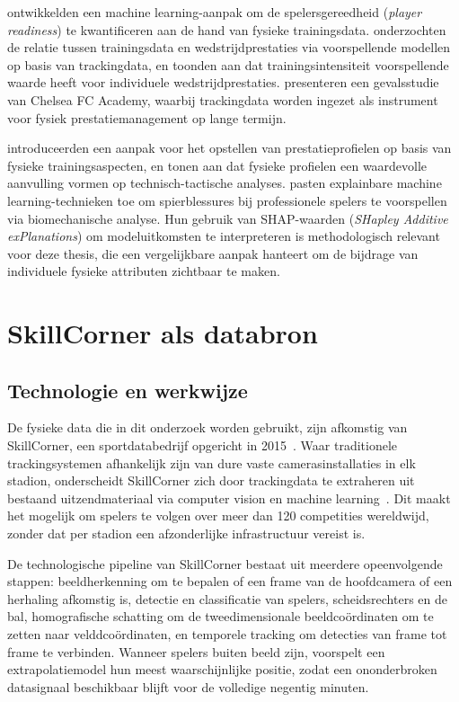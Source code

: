 \textcite{Mandorino2023_PlayerReadiness} ontwikkelden een machine learning-aanpak om de spelersgereedheid (\textit{player readiness}) te kwantificeren aan de hand van fysieke trainingsdata. \textcite{Fernndez2016FromTT} onderzochten de relatie tussen trainingsdata en wedstrijdprestaties via voorspellende modellen op basis van trackingdata, en toonden aan dat trainingsintensiteit voorspellende waarde heeft voor individuele wedstrijdprestaties. \textcite{sports6040130} presenteren een gevalsstudie van Chelsea FC Academy, waarbij trackingdata worden ingezet als instrument voor fysiek prestatiemanagement op lange termijn.
 
\textcite{sports13110402} introduceerden een aanpak voor het opstellen van prestatieprofielen op basis van fysieke trainingsaspecten, en tonen aan dat fysieke profielen een waardevolle aanvulling vormen op technisch-tactische analyses. \textcite{CalderonDiaz2023_ExplainableML_Soccer} pasten explainbare machine learning-technieken toe om spierblessures bij professionele spelers te voorspellen via biomechanische analyse. Hun gebruik van SHAP-waarden (\textit{SHapley Additive exPlanations}) om modeluitkomsten te interpreteren is methodologisch relevant voor deze thesis, die een vergelijkbare aanpak hanteert om de bijdrage van individuele fysieke attributen zichtbaar te maken.
 
\section{SkillCorner als databron}
 
\subsection{Technologie en werkwijze}
 
De fysieke data die in dit onderzoek worden gebruikt, zijn afkomstig van SkillCorner, een sportdatabedrijf opgericht in 2015~\autocite{skillcorner-website}. Waar traditionele trackingsystemen afhankelijk zijn van dure vaste camerasinstallaties in elk stadion, onderscheidt SkillCorner zich door trackingdata te extraheren uit bestaand uitzendmateriaal via computer vision en machine learning~\autocite{skillcorner-opendata}. Dit maakt het mogelijk om spelers te volgen over meer dan 120 competities wereldwijd, zonder dat per stadion een afzonderlijke infrastructuur vereist is.
 
De technologische pipeline van SkillCorner bestaat uit meerdere opeenvolgende stappen: beeldherkenning om te bepalen of een frame van de hoofdcamera of een herhaling afkomstig is, detectie en classificatie van spelers, scheidsrechters en de bal, homografische schatting om de tweedimensionale beeldcoördinaten om te zetten naar velddcoördinaten, en temporele tracking om detecties van frame tot frame te verbinden. Wanneer spelers buiten beeld zijn, voorspelt een extrapolatiemodel hun meest waarschijnlijke positie, zodat een ononderbroken datasignaal beschikbaar blijft voor de volledige negentig minuten.
 
